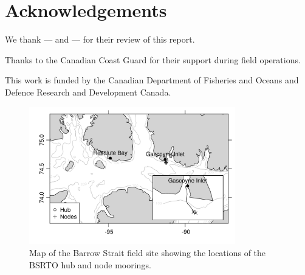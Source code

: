 \documentclass[12pt]{dforeport}
\begin{document}
\section{Acknowledgements}

We thank --- and --- for their review of this report.

\noindent
Thanks to the Canadian Coast Guard for their support during field operations.

\noindent
This work is funded by the Canadian Department of Fisheries and Oceans and Defence Research and Development Canada. 

\pagebreak




\pagebreak

\begin{figure}
\centering
\includegraphics[width = 0.8\textwidth]{./figures/01_BSFieldSiteOverview.png}
\caption[Map of field site]{Map of the Barrow Strait field site showing the locations of the BSRTO hub and node moorings.}
\label{f:map}
\end{figure}
\end{document}

